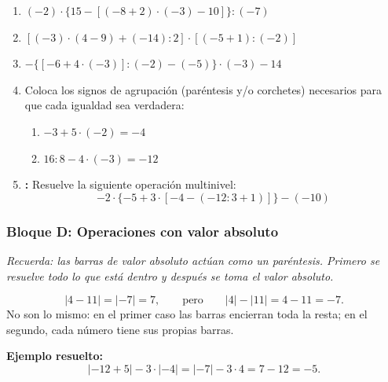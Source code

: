 \documentclass[12pt, letterpaper]{article}
\begin{document}
\begin{enumerate}[leftmargin=*, start=114]
  \item \dificil{} $(-2) \cdot \{15 - [(-8 + 2) \cdot (-3) - 10]\} : (-7)$

  \item \dificil{} $[(-3) \cdot (4 - 9) + (-14) : 2] \cdot [(-5 + 1) : (-2)]$

  \item \dificil{} $-\{[-6 + 4 \cdot (-3)] : (-2) - (-5)\} \cdot (-3) - 14$

  \item \dificil{} Coloca los signos de agrupación (paréntesis y/o corchetes) necesarios para que cada igualdad sea verdadera:
        \begin{enumerate}[label=\alph*)]
          \item $-3 + 5 \cdot (-2) = -4$
          \item $16 : 8 - 4 \cdot (-3) = -12$
        \end{enumerate}

  \item \dificil{} \textbf{:} Resuelve la siguiente operación multinivel:
        \[
          -2 \cdot \{ -5 + 3 \cdot [ -4 - (-12 : 3 + 1) ] \} - (-10)
        \]
\end{enumerate}

\subsubsection*{Bloque D: Operaciones con valor absoluto}

\textit{Recuerda: las barras de valor absoluto actúan como un \emph{paréntesis}. Primero se resuelve todo lo que está dentro y \emph{después} se toma el valor absoluto.}

\begin{cuadroadvertencia}
  \[
    |4 - 11| = |-7| = 7,
    \qquad \text{pero} \qquad
    |4| - |11| = 4 - 11 = -7.
  \]
  No son lo mismo: en el primer caso las barras encierran toda la resta; en el segundo, cada número tiene sus propias barras.
\end{cuadroadvertencia}

\noindent\textbf{Ejemplo resuelto:}
\[
  |-12 + 5| - 3 \cdot |-4| = |-7| - 3 \cdot 4 = 7 - 12 = -5.
\]
\end{document}
